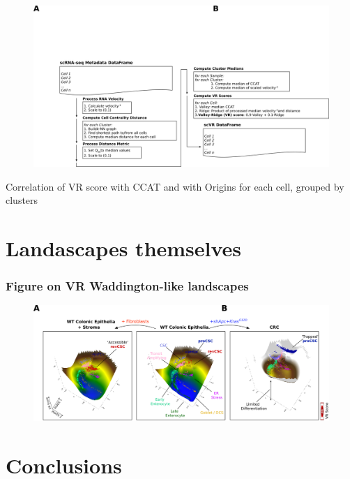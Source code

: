 \begin{figure}
    \centering
    \includegraphics{05vr/figs/5VR_Score.png}
    \caption{}
    \label{fig:}
\end{figure}

Correlation of VR score with CCAT and with Origins for each cell, grouped by clusters

\section{Landascapes themselves}


\subsubsection{Figure on VR Waddington-like landscapes}

\begin{figure}
    \centering
    \includegraphics{05vr/figs/5VR_Landscape.png}
    \caption{}
    \label{fig:}
\end{figure}

\section{Conclusions}




